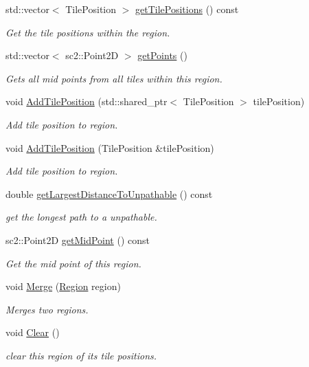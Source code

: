 \begin{DoxyCompactItemize}
std\+::vector$<$ Tile\+Position $>$ \hyperlink{classOverseer_1_1Region_a1f2394879dc342b7ba9248eabea7258a}{get\+Tile\+Positions} () const 
\begin{DoxyCompactList}\small\item\em Get the tile positions within the region. \end{DoxyCompactList}\item 
std\+::vector$<$ sc2\+::\+Point2D $>$ \hyperlink{classOverseer_1_1Region_a0319cac0728db48d38565bf2593a021f}{get\+Points} ()
\begin{DoxyCompactList}\small\item\em Gets all mid points from all tiles within this region. \end{DoxyCompactList}\item 
void \hyperlink{classOverseer_1_1Region_afcaa70e448891547ef6fd62a259c2408}{Add\+Tile\+Position} (std\+::shared\+\_\+ptr$<$ Tile\+Position $>$ tile\+Position)
\begin{DoxyCompactList}\small\item\em Add tile position to region. \end{DoxyCompactList}\item 
void \hyperlink{classOverseer_1_1Region_af770c2a14f8374bf4e5aaa6d9b7f8a4f}{Add\+Tile\+Position} (Tile\+Position \&tile\+Position)
\begin{DoxyCompactList}\small\item\em Add tile position to region. \end{DoxyCompactList}\item 
double \hyperlink{classOverseer_1_1Region_a25b4ea47336ca35c9bdbe557c27575a4}{get\+Largest\+Distance\+To\+Unpathable} () const 
\begin{DoxyCompactList}\small\item\em get the longest path to a unpathable. \end{DoxyCompactList}\item 
sc2\+::\+Point2D \hyperlink{classOverseer_1_1Region_a84817e4b71bd078d55124ba6a2817a74}{get\+Mid\+Point} () const 
\begin{DoxyCompactList}\small\item\em Get the mid point of this region. \end{DoxyCompactList}\item 
void \hyperlink{classOverseer_1_1Region_af1d0842a7f894786baa4a5af469b608d}{Merge} (\hyperlink{classOverseer_1_1Region}{Region} region)
\begin{DoxyCompactList}\small\item\em Merges two regions. \end{DoxyCompactList}\item 
void \hyperlink{classOverseer_1_1Region_aff2d0229f2943c243d1a28f4e3c85a06}{Clear} ()\hypertarget{classOverseer_1_1Region_aff2d0229f2943c243d1a28f4e3c85a06}{}\label{classOverseer_1_1Region_aff2d0229f2943c243d1a28f4e3c85a06}

\begin{DoxyCompactList}\small\item\em clear this region of its tile positions. \end{DoxyCompactList}\end{DoxyCompactItemize}


